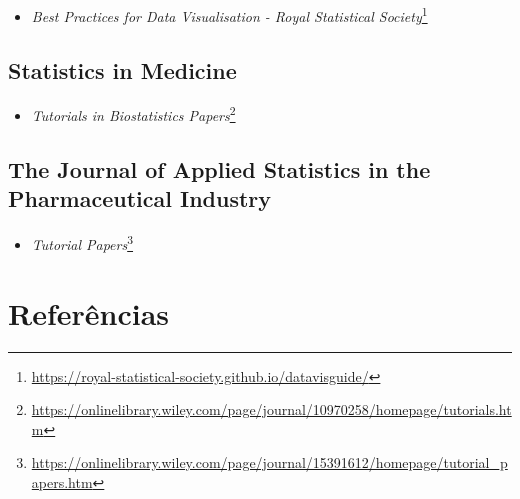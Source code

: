 \documentclass[
  a4paper,
]{book}
\providecommand{\tightlist}{%
  \setlength{\itemsep}{0pt}\setlength{\parskip}{0pt}}
\renewcommand{\href}[2]{#2\footnote{\url{#1}}}
\newcommand{\DisableFootNotes}{%
  \renewcommand{\footnote}[2][]{\relax}
}
\begin{document}
\begin{itemize}
\tightlist
\item
  \href{https://royal-statistical-society.github.io/datavisguide/}{\emph{Best Practices for Data Visualisation - Royal Statistical Society}}
\end{itemize}

\hypertarget{statistics-in-medicine}{%
\section*{Statistics in Medicine}\label{statistics-in-medicine}}

\begin{itemize}
\tightlist
\item
  \href{https://onlinelibrary.wiley.com/page/journal/10970258/homepage/tutorials.htm}{\emph{Tutorials in Biostatistics Papers}}
\end{itemize}

\hypertarget{the-journal-of-applied-statistics-in-the-pharmaceutical-industry}{%
\section*{The Journal of Applied Statistics in the Pharmaceutical Industry}\label{the-journal-of-applied-statistics-in-the-pharmaceutical-industry}}

\begin{itemize}
\tightlist
\item
  \href{https://onlinelibrary.wiley.com/page/journal/15391612/homepage/tutorial_papers.htm}{\emph{Tutorial Papers}}
\end{itemize}

\hypertarget{referuxeancias}{%
\chapter*{\texorpdfstring{\textbf{Referências}}{Referências}}\label{referuxeancias}}

\DisableFootNotes
\end{document}
